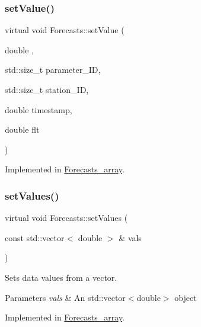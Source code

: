 \subsubsection{\texorpdfstring{set\+Value()}{setValue()}\hspace{0.1cm}{\footnotesize\ttfamily [2/2]}}
{\footnotesize\ttfamily virtual void Forecasts\+::set\+Value (\begin{DoxyParamCaption}\item[{double}]{,  }\item[{std\+::size\+\_\+t}]{parameter\+\_\+\+ID,  }\item[{std\+::size\+\_\+t}]{station\+\_\+\+ID,  }\item[{double}]{timestamp,  }\item[{double}]{flt }\end{DoxyParamCaption})\hspace{0.3cm}{\ttfamily [pure virtual]}}



Implemented in \mbox{\hyperlink{class_forecasts__array_a7224d8333630fcd162a1b69b49241d2f}{Forecasts\+\_\+array}}.

\mbox{\label{class_forecasts_ae2a59385e03dd372fef3dfe89f5a31cf}} 
\subsubsection{\texorpdfstring{set\+Values()}{setValues()}}
{\footnotesize\ttfamily virtual void Forecasts\+::set\+Values (\begin{DoxyParamCaption}\item[{const std\+::vector$<$ double $>$ \&}]{vals }\end{DoxyParamCaption})\hspace{0.3cm}{\ttfamily [pure virtual]}}

Sets data values from a vector.


\begin{DoxyParams}{Parameters}
{\em vals} & An std\+::vector$<$double$>$ object \\
\hline
\end{DoxyParams}


Implemented in \mbox{\hyperlink{class_forecasts__array_af31e7741f2e048593cbec1c317210b65}{Forecasts\+\_\+array}}.

\mbox{\label{class_forecasts_a8c7d29af8edb5c3bc6a6aad2220506a9}} 
